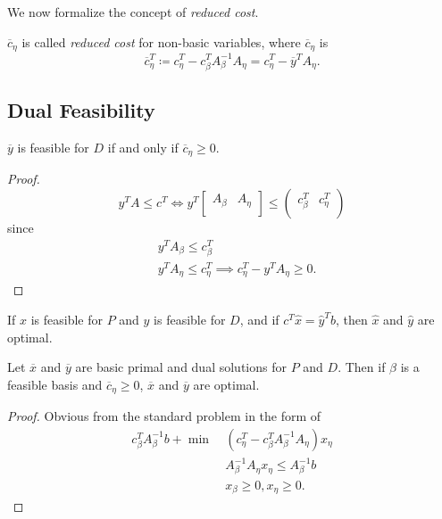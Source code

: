 We now formalize the concept of \emph{reduced cost}.
\begin{definition}
	\(\overline{c}_{\eta}\) is called \emph{reduced cost} for non-basic variables, where \(\overline{c}_{\eta}\) is
	\[
		\overline{c}_{\eta}^{T} \coloneqq c_{\eta}^{T} - c_{\beta}^{T} A^{-1}_{\beta}A_{\eta} = c_{\eta}^{T} - \overline{y}^{T}A_{\eta}.
	\]
\end{definition}

\subsection{Dual Feasibility}
\begin{lemma}
	\(\overline{y}\) is feasible for \(D\) if and only if \(\overline{c}_{\eta}\geq 0\).
\end{lemma}
\begin{proof}
	\[
		y^{T}A\leq c^{T} \iff y^{T}\begin{bmatrix}
			A_{\beta} & A_{\eta} \\
		\end{bmatrix}\leq \begin{pmatrix}
			c_{\beta}^{T} & c_{\eta}^{T} \\
		\end{pmatrix}
	\]
	since
	\[
		\begin{alignedat}{3}
			&y^{T} A_{\beta}\leq c_{\beta}^{T}\\
			&y^{T} A_{\eta}\leq c_{\eta}^{T} \implies c_{\eta}^{T} - y^{T}A_{\eta}\geq 0.
		\end{alignedat}
	\]
\end{proof}

\begin{corollary}
	If \(\hat{x}\) is feasible for \(P\) and \(\hat{y}\) is feasible for \(D\), and if \(c^{T}\hat{x} = \hat{y}^{T} b\), then \(\hat{x}\) and \(\hat{y}\) are optimal.
\end{corollary}

\begin{theorem}
	Let \(\overline{x}\) and \(\overline{y}\) are basic primal and dual solutions for \(P\) and \(D\). Then if \(\beta\) is a feasible basis and \(\overline{c}_{\eta}\geq 0\), \(\overline{x}\) and
	\(\overline{y}\) are optimal.
\end{theorem}
\begin{proof}
	Obvious from the standard problem in the form of
	\begin{align*}
		c^{T}_{\beta}A^{-1}_{\beta}b + \min~ & (c_{\eta}^{T} - c_{\beta}^{T}A^{-1}_{\beta}A_{\eta})x_{\eta} \\
		                                     & A^{-1}_{\beta}A_{\eta}x_{\eta} \leq A^{-1}_{\beta}b          \\
		                                     & x_{\beta}\geq 0, x_{\eta}\geq 0.
	\end{align*}
\end{proof}

